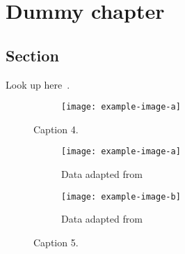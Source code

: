 \documentclass[../main.tex]{subfiles}
\begin{document}
\chapter{Dummy chapter}\label{ch:Chapter4} %


\lipsum[2-4]


\section{Section}

\lipsum[1-3]

Look up here~\cite{Zorin:22}.


\begin{figure}[ht]
\centering
    \begin{subfigure}{0.7\columnwidth}
    \texttt{[image: example-image-a]}
      \caption*{}
    \end{subfigure}
    \caption{Caption 4.}
    \label{fig:fig_4-1}
\end{figure}

\lipsum[3-4]


\begin{figure}[ht]
\centering
    \begin{subfigure}[t]{.59\columnwidth}
      \texttt{[image: example-image-a]}
      \caption{Data adapted from~\cite{Zorin:22} \label{fig:4-a}}
    \end{subfigure}
    \begin{subfigure}[t]{.39\columnwidth}
      \texttt{[image: example-image-b]}
      \caption{Data adapted from~\cite{Zorin:22}\label{fig:4-b}}
    \end{subfigure}
    \caption{Caption 5.}
    \label{fig:fig_4-2}
\end{figure}
\end{document}

